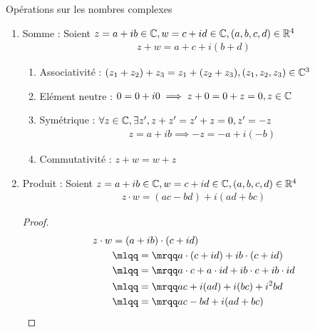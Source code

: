\begin{proposition}{Opérations sur les nombres complexes}
\begin{enumerate}
\item Somme : Soient $z = a + ib \in \mathbb{C}, w = c + id \in \mathbb{C}, (a, b, c, d) \in \mathbb{R}^4$
\begin{align*}
z + w = a + c + i (b + d)
\end{align*}

\begin{enumerate}
\item Associativité : $(z_1 + z_2) + z_3 = z_1 + (z_2 + z_3), (z_1, z_2, z_3) \in \mathbb{C}^3$
\item Elément neutre : $0 = 0 + i0 \implies z + 0 = 0 + z = 0, z \in \mathbb{C}$
\item Symétrique : $\forall z \in \mathbb{C}, \exists z', z + z' = z' + z = 0, z' = -z$
\begin{align*}
z = a + ib \implies -z = -a + i(-b)
\end{align*}
\item Commutativité : $z + w = w + z$
\end{enumerate}

\item Produit : Soient $z = a + ib \in \mathbb{C}, w = c + id \in \mathbb{C}, (a, b, c, d) \in \mathbb{R}^4$
\begin{align*}
z \cdot w = (ac - bd) + i(ad + bc)
\end{align*}

\begin{proof}
\begin{align*}
z \cdot w &= (a + ib) \cdot (c + id) \\
          &\mlqq=\mrqq a \cdot (c + id) + ib \cdot (c + id) \\
          &\mlqq=\mrqq a \cdot c + a \cdot id + ib \cdot c + ib \cdot id \\
          &\mlqq=\mrqq ac + i(ad) + i(bc) + i^2 bd \\
          &\mlqq=\mrqq ac - bd + i(ad + bc)
\end{align*}
\end{proof}


\end{enumerate}
\end{proposition}
